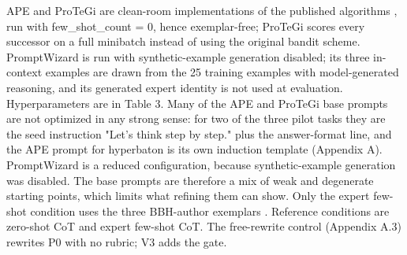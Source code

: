 \documentclass{ieeeaccess}
\begin{document}
APE and ProTeGi are clean-room implementations of the published algorithms \cite{zhou2023,pryzant2023}, run with few\_\allowbreak{}shot\_\allowbreak{}count = 0, hence exemplar-free; ProTeGi scores every successor on a full minibatch instead of using the original bandit scheme. PromptWizard \cite{agarwal2025} is run with synthetic-example generation disabled; its three in-context examples are drawn from the 25 training examples with model-generated reasoning, and its generated expert identity is not used at evaluation. Hyperparameters are in Table 3. Many of the APE and ProTeGi base prompts are not optimized in any strong sense: for two of the three pilot tasks they are the seed instruction "Let's think step by step." plus the answer-format line, and the APE prompt for hyperbaton is its own induction template (Appendix A). PromptWizard is a reduced configuration, because synthetic-example generation was disabled. The base prompts are therefore a mix of weak and degenerate starting points, which limits what refining them can show. Only the expert few-shot condition uses the three BBH-author exemplars \cite{suzgun2023}. Reference conditions are zero-shot CoT \cite{kojima2022} and expert few-shot CoT. The free-rewrite control (Appendix A.3) rewrites P0 with no rubric; V3 adds the gate.
\end{document}
